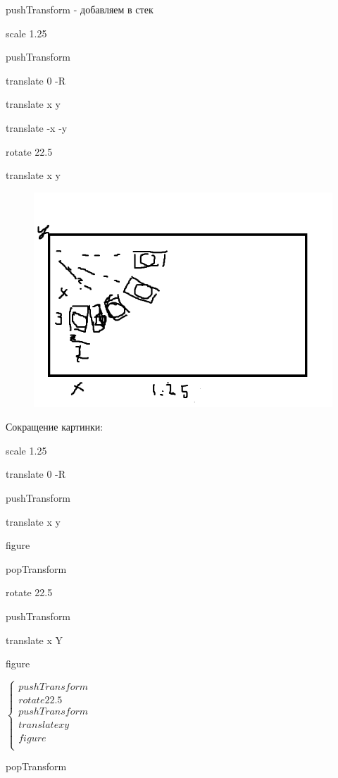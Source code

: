\documentclass{article}
\begin{document}
pushTransform - добавляем в стек

\vspace{1cm}

scale 1.25

pushTransform

translate 0 -R

translate x y



translate -x -y

rotate 22.5

translate x y
\begin{figure} [H]
    \includegraphics[width=0.50\linewidth]{3.png}
\end{figure}




Сокращение картинки:

scale 1.25

translate 0 -R

pushTransform

translate x y

figure

popTransform

rotate 22.5

pushTransform

translate x Y

figure


$\begin{cases}
    
pushTransform \\

rotate 22.5 \\

pushTransform \\

translate x y \\

figure \\

\end{cases}$

popTransform
\end{document}
